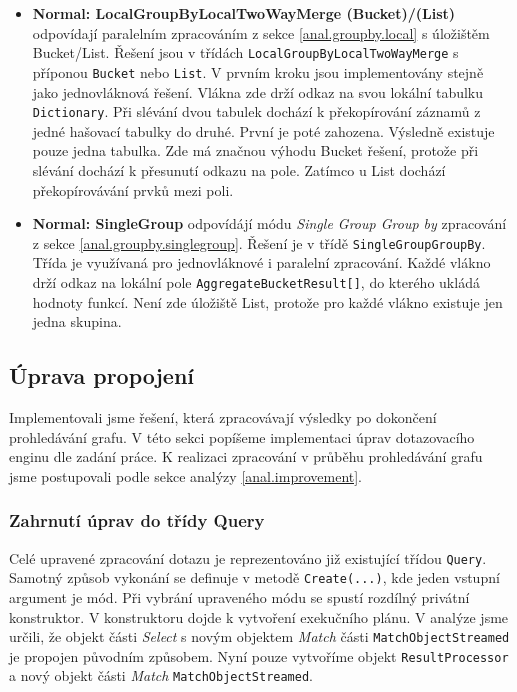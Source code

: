 \begin{itemize}
\item \textbf{Normal: LocalGroupByLocalTwoWayMerge (Bucket)}\textbf{/(List)} odpovídají paralelním zpracováním z sekce \ref{anal.groupby.local} s úložištěm Bucket/List.
Řešení jsou v třídách \texttt{LocalGroupByLocalTwoWayMerge} s příponou \texttt{Bucket} nebo \texttt{List}.
V prvním kroku jsou implementovány stejně jako jednovláknová řešení.
Vlákna zde drží odkaz na svou lokální tabulku \texttt{Dictionary}.
Při slévání dvou tabulek dochází k překopírování záznamů z jedné hašovací tabulky do druhé.
První je poté zahozena.
Výsledně existuje pouze jedna tabulka. 
Zde má značnou výhodu Bucket řešení, protože při slévání dochází k přesunutí odkazu na pole.
Zatímco u List dochází překopírovávání prvků mezi poli. 

\item \textbf{Normal: SingleGroup} odpovídájí módu \textit{Single Group Group by} zpracování z sekce \ref{anal.groupby.singlegroup}.
Řešení je v třídě \texttt{SingleGroupGroupBy}.
Třída je využívaná pro jednovláknové i paralelní zpracování.
Každé vlákno drží odkaz na lokální pole \texttt{AggregateBucketResult[]}, do kterého ukládá hodnoty funkcí.
Není zde úložiště List, protože pro každé vlákno existuje jen jedna skupina.

\end{itemize}

\subsection{Úprava propojení}

Implementovali jsme řešení, která zpracovávají výsledky po dokončení prohledávání grafu.
V této sekci popíšeme implementaci úprav dotazovacího enginu dle zadání práce.
K realizaci zpracování v průběhu prohledávání grafu jsme postupovali podle sekce analýzy \ref{anal.improvement}.

\subsubsection{Zahrnutí úprav do třídy Query}

Celé upravené zpracování dotazu je reprezentováno již existující třídou \texttt{Query}.
Samotný způsob vykonání se definuje v metodě \texttt{Create(...)}, kde jeden vstupní argument je mód.
Při vybrání upraveného módu se spustí rozdílný privátní konstruktor.
V konstruktoru dojde k vytvoření exekučního plánu.
V analýze jsme určili, že objekt části \textit{Select} s novým objektem \textit{Match} části \texttt{MatchObjectStreamed} je propojen původním způsobem.
Nyní pouze vytvoříme objekt \texttt{ResultProcessor} a nový objekt části \textit{Match} \texttt{MatchObjectStreamed}. 

